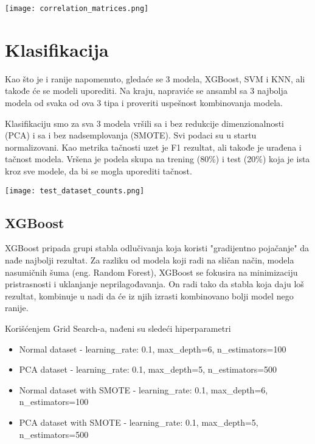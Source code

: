 \documentclass[a4paper]{article}
\begin{document}
    \begin{center}
        \label{im:correlation_matrices}
        \texttt{[image: correlation\_matrices.png]}
    \end{center}

\section{Klasifikacija}
    Kao što je i ranije napomenuto, gledaće se 3 modela, XGBoost, SVM i KNN, ali takođe će se modeli uporediti. Na kraju, napraviće se ansambl sa 3 najbolja modela od svaka od ova 3 tipa i proveriti uspešnost kombinovanja modela.
    \par
    Klasifikaciju smo za sva 3 modela vršili sa i bez redukcije dimenzionalnosti (PCA) i sa i bez nadsemplovanja (SMOTE). Svi podaci su u startu normalizovani. Kao metrika tačnosti uzet je F1 rezultat, ali takođe je urađena i tačnost modela. Vršena je podela skupa na trening (80\%) i test (20\%) koja je ista kroz sve modele, da bi se mogla uporediti tačnost. 
    \begin{center}
        \label{im:test_dataset_counts Score}
        \texttt{[image: test\_dataset\_counts.png]}
    \end{center}

    \subsection{XGBoost}
        XGBoost pripada grupi stabla odlučivanja koja koristi "gradijentno pojačanje" da nađe najbolji rezultat. Za razliku od modela koji radi na sličan način, modela nasumičnih šuma (eng. Random Forest), XGBoost se fokusira na minimizaciju pristrasnosti i uklanjanje neprilagođavanja. On radi tako da stabla koja daju loš rezultat, kombinuje u nadi da će iz njih izrasti kombinovano bolji model nego ranije. 

        \par Korišćenjem Grid Search-a, nađeni su sledeći hiperparametri
        \begin{itemize}
            \item Normal dataset - learning\_rate: 0.1, max\_depth=6, n\_estimators=100
            \item PCA dataset - learning\_rate: 0.1, max\_depth=5, n\_estimators=500
            \item Normal dataset with SMOTE - learning\_rate: 0.1, max\_depth=6, n\_estimators=100
            \item PCA dataset with SMOTE - learning\_rate: 0.1, max\_depth=5, n\_estimators=500
        \end{itemize}
\end{document}
